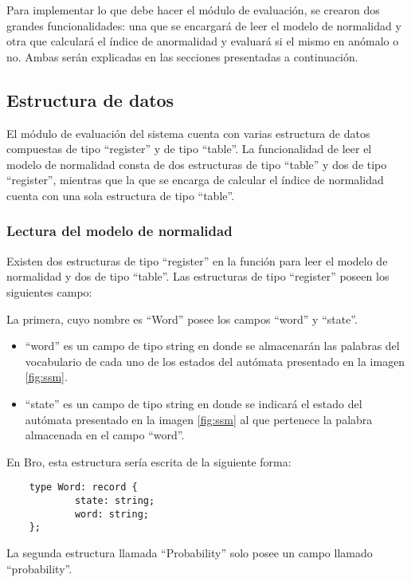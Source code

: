 Para implementar lo que debe hacer el módulo de evaluación, se crearon dos grandes funcionalidades: una que se encargará de leer el modelo de normalidad y  otra que calculará el índice de anormalidad y evaluará si el mismo en anómalo o no. Ambas serán explicadas en las secciones presentadas a continuación.

\subsection{Estructura de datos}

El módulo de evaluación del sistema cuenta con varias estructura de datos compuestas de tipo “register” y de tipo “table”. La funcionalidad de leer el modelo de normalidad consta de dos estructuras de tipo “table” y dos de tipo “register”, mientras que la que se encarga de calcular el índice de normalidad cuenta con una sola estructura de tipo “table”.

\subsubsection{Lectura del modelo de normalidad}

Existen dos estructuras de tipo “register” en la función para leer el modelo de normalidad y dos de tipo “table”.
Las estructuras de tipo “register” poseen los siguientes campo:

La primera, cuyo nombre es “Word” posee los campos “word” y  “state”.

\begin{itemize}
\item “word” es un campo de tipo string en donde se almacenarán las palabras del vocabulario de cada uno de los estados del autómata presentado en la imagen \ref{fig:ssm}.
\item “state” es un campo de tipo string en donde se indicará el estado del autómata presentado en la imagen \ref{fig:ssm} al que pertenece la palabra almacenada en el campo “word”.
\end{itemize}

En Bro, esta estructura sería escrita de la siguiente forma:

\begin{verbatim}
    type Word: record {
            state: string;
            word: string;
    };
\end{verbatim}

La segunda estructura llamada “Probability” solo posee un campo llamado “probability”.

